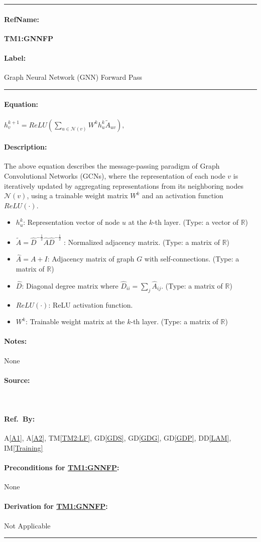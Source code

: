 \documentclass[12pt]{article}
\newcommand{\dref}[1]{GD\ref{#1}}
\newcommand{\ddref}[1]{DD\ref{#1}}
\newcommand{\tref}[1]{TM\ref{#1}}
\newcommand{\aref}[1]{A\ref{#1}}
\newcommand{\iref}[1]{IM\ref{#1}}
\newcommand{\deftheory}[9][Not Applicable]
{
\newpage
\noindent \rule{\textwidth}{0.5mm}

\paragraph{RefName: } \textbf{#2} \phantomsection 
\label{#2}

\paragraph{Label:} #3

\noindent \rule{\textwidth}{0.5mm}

\paragraph{Equation:}

#4

\paragraph{Description:}

#5

\paragraph{Notes:}

#6

\paragraph{Source:}

#7

\paragraph{Ref.\ By:}

#8

\paragraph{Preconditions for \hyperref[#2]{#2}:}
\label{#2_precond}

#9

\paragraph{Derivation for \hyperref[#2]{#2}:}
\label{#2_deriv}

#1

\noindent \rule{\textwidth}{0.5mm}

}
\begin{document}
\noindent
\deftheory
{TM1:GNNFP}
{Graph Neural Network (GNN) Forward Pass}
{
  $h_v^{k+1} = ReLU \left( \sum_{u \in \mathcal{N}(v)} W^k h_u^k \tilde{A}_{uv} \right),$
}
{The above equation describes the message-passing paradigm of Graph Convolutional Networks (GCNs), where the representation of each node \( v \) is iteratively updated by aggregating representations from its neighboring nodes \( \mathcal{N}(v) \), using a trainable weight matrix \( W^k \) and an activation function \(ReLU(\cdot)\).


\begin{itemize}
    \item \( h_u^k \): Representation vector of node \( u \) at the \( k \)-th layer. (Type: a vector of $\mathbb{R}$)
    \item \( \tilde{A} = \hat{D}^{-\frac{1}{2}} \hat{A} \hat{D}^{-\frac{1}{2}} \) :  Normalized adjacency matrix. (Type: a matrix of $\mathbb{R}$)
    \item \( \hat{A} = A + I \):  Adjacency matrix of graph \( G \) with self-connections. (Type: a matrix of $\mathbb{R}$)
    \item \( \hat{D} \):  Diagonal degree matrix where \( \hat{D}_{ii} = \sum_j \hat{A}_{ij} \). (Type: a matrix of $\mathbb{R}$)
    \item \(ReLU (\cdot) \):  ReLU activation function.
    \item \( W^k \):  Trainable weight matrix at the \( k \)-th layer. (Type: a matrix of $\mathbb{R}$)
\end{itemize}
}
{
None
}
{
  ~\cite{kipf2016}
}
{
  \aref{A1}, \aref{A2}, \tref{TM2:LF}, \dref{GDS}, \dref{GDG}, \dref{GDP}, \ddref{LAM}, \iref{Training}
}
{
None
}
{}
\end{document}
